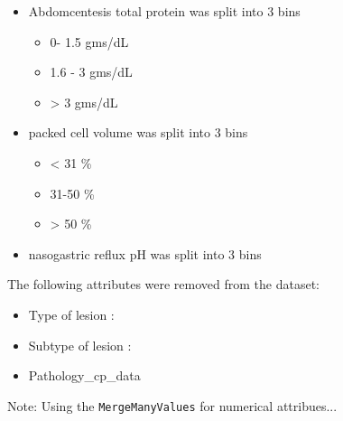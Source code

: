\begin{itemize}
\item Abdomcentesis total protein was split into 3 bins
\begin{itemize}
\item 0- 1.5 gms/dL
\item 1.6 - 3 gms/dL
\item > 3 gms/dL
\end{itemize}

\item packed cell volume was split into 3 bins
\begin{itemize}
\item < 31 \%
\item 31-50 \%
\item > 50 \%
\end{itemize}

\item nasogastric reflux pH was split into 3 bins



\end{itemize}


The following attributes were removed from the dataset:
\begin{itemize}
\item Type of lesion :
\item Subtype of lesion : 
\item Pathology_cp_data
\end{itemize}


Note: Using the \verb|MergeManyValues| for numerical attribues...